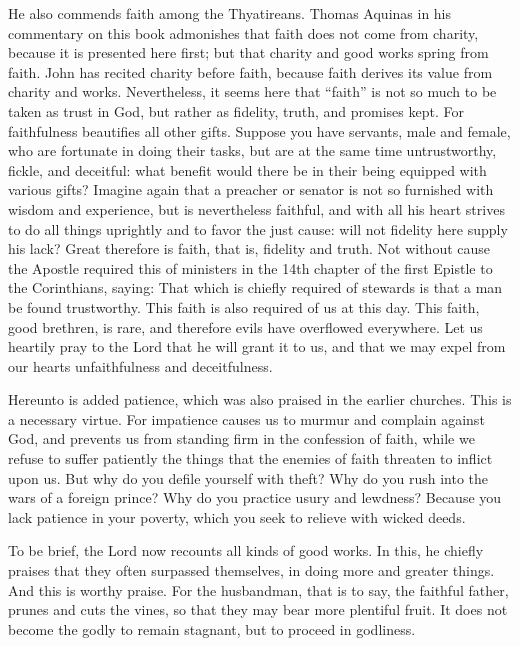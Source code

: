 He also commends faith among the Thyatireans. Thomas Aquinas in his commentary on this book admonishes that faith does not come from charity, because it is presented here first; but that charity and good works spring from faith. John has recited charity before faith, because faith derives its value from charity and works. Nevertheless, it seems here that “faith” is not so much to be taken as trust in God, but rather as fidelity, truth, and promises kept. For faithfulness beautifies all other gifts. Suppose you have servants, male and female, who are fortunate in doing their tasks, but are at the same time untrustworthy, fickle, and deceitful: what benefit would there be in their being equipped with various gifts? Imagine again that a preacher or senator is not so furnished with wisdom and experience, but is nevertheless faithful, and with all his heart strives to do all things uprightly and to favor the just cause: will not fidelity here supply his lack? Great therefore is faith, that is, fidelity and truth. Not without cause the Apostle required this of ministers in the 14th chapter of the first Epistle to the Corinthians, saying: That which is chiefly required of stewards is that a man be found trustworthy. This faith is also required of us at this day. This faith, good brethren, is rare, and therefore evils have overflowed everywhere. Let us heartily pray to the Lord that he will grant it to us, and that we may expel from our hearts unfaithfulness and deceitfulness.

Hereunto is added patience, which was also praised in the earlier churches. This is a necessary virtue. For impatience causes us to murmur and complain against God, and prevents us from standing firm in the confession of faith, while we refuse to suffer patiently the things that the enemies of faith threaten to inflict upon us. But why do you defile yourself with theft? Why do you rush into the wars of a foreign prince? Why do you practice usury and lewdness? Because you lack patience in your poverty, which you seek to relieve with wicked deeds.

To be brief, the Lord now recounts all kinds of good works. In this, he chiefly praises that they often surpassed themselves, in doing more and greater things. And this is worthy praise. For the husbandman, that is to say, the faithful father, prunes and cuts the vines, so that they may bear more plentiful fruit. It does not become the godly to remain stagnant, but to proceed in godliness.

